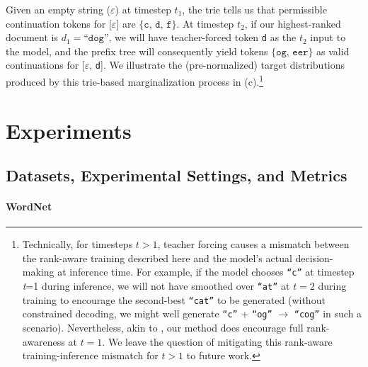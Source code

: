 \documentclass[11pt, a4paper, onecolumn, confidential, copyright, gdm]{google}
\begin{document}
Given an empty string ($\varepsilon$) at timestep $t_1$, the trie tells us that permissible continuation tokens for [$\varepsilon$] are $\{\texttt{c, d, f}\}$. At timestep $t_2$, if our highest-ranked document is $d_1 = \texttt{``dog''}$, we will have teacher-forced token \texttt{d} as the $t_2$ input to the model, and the prefix tree will consequently yield tokens $\{\texttt{og, eer}\}$ as valid continuations for [$\varepsilon$, \texttt{d}]. We illustrate the (pre-normalized) target distributions produced by this trie-based marginalization process in (c).\footnote{Technically, for timesteps $t>1$, teacher forcing causes a mismatch between the rank-aware training described here and the model's actual decision-making at inference time. For example, if the model chooses \texttt{``c''} at timestep \textit{t}=1 during inference, we will not have smoothed over \texttt{``at''} at $t=2$ during training to encourage the second-best \texttt{``cat''} to be generated (without constrained decoding, we might well generate \texttt{``c''} $+$ \texttt{``og''} $\rightarrow$ \texttt{``cog''} in such a scenario). Nevertheless, akin to \citet{reddy2024first}, our method does encourage full rank-awareness at $t=1$. We leave the question of mitigating this rank-aware training-inference mismatch for $t>1$ to future work.}

\section{Experiments}

\vspace{0.1cm}
\subsection{Datasets, Experimental Settings, and Metrics}\label{sec:experimental-setup}

\paragraph{WordNet}\label{sec:wordnet-dataset}
\end{document}
